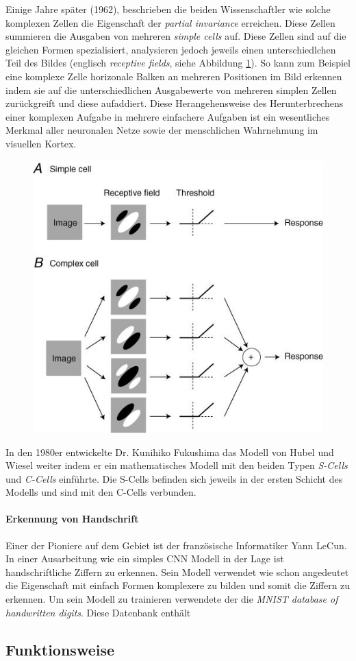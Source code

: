 Einige Jahre später (1962), beschrieben die beiden Wissenschaftler wie solche komplexen Zellen die Eigenschaft der \emph{partial invariance} erreichen. Diese Zellen summieren die Ausgaben von mehreren \emph{simple cells} auf. Diese Zellen sind auf die gleichen Formen spezialisiert, analysieren jedoch jeweils einen unterschiedlchen Teil des Bildes (englisch \emph{receptive fields}, siehe Abbildung \ref{fig:simpleVsComplex}). So kann zum Beispiel eine komplexe Zelle horizonale Balken an mehreren Positionen im Bild erkennen indem sie auf die unterschiedlichen Ausgabewerte von mehreren simplen Zellen zurückgreift und diese aufaddiert. Diese Herangehensweise des Herunterbrechens einer komplexen Aufgabe in mehrere einfachere Aufgaben ist ein wesentliches Merkmal aller neuronalen Netze sowie der menschlichen Wahrnehmung im visuellen Kortex. 

\begin{figure}[!htb]
	\centering
	\includegraphics[width=.6\linewidth]{img/simpleVsComplex}
	\label{fig:simpleVsComplex}
\end{figure}

In den 1980er entwickelte Dr. Kunihiko Fukushima das Modell von Hubel und Wiesel weiter indem er ein mathematisches Modell mit den beiden Typen \emph{S-Cells} und \emph{C-Cells} einführte. Die S-Cells befinden sich jeweils in der ersten Schicht des Modells und sind mit den C-Cells verbunden. 

\paragraph{Erkennung von Handschrift}
Einer der Pioniere auf dem Gebiet ist der französische Informatiker Yann LeCun. In einer Ausarbeitung wie ein simples CNN Modell in der Lage ist handschriftliche Ziffern zu erkennen. Sein Modell verwendet wie schon angedeutet die Eigenschaft mit einfach Formen komplexere zu bilden und somit die Ziffern zu erkennen. Um sein Modell zu trainieren verwendete der die \emph{MNIST database of handwritten digits}. Diese Datenbank enthält 




\subsection{Funktionsweise}
\blindtext
